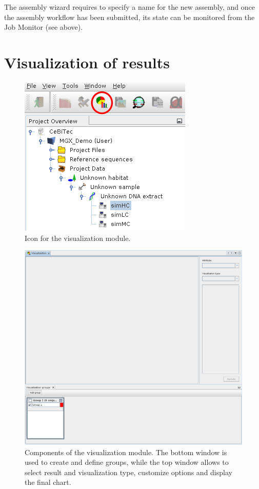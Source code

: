\noindent
The assembly wizard requires to specify a name for the new assembly, and once the assembly workflow has been
submitted, its state can be monitored from the Job Monitor (see above).
\section{Visualization of results}

\begin{figure}[H]
\centering
\includegraphics[width=.6\textwidth]{img/mgx/VizOpen}
\caption[Visualization]{Icon for the visualization module.}
\label{viz1}
\end{figure}

\begin{figure}[H]
\centering
\includegraphics[width=.8\textwidth]{img/mgx/VizComponent}
\caption[Visualization components]{Components of the visualization module. The bottom window is
used to create and define groups, while the top window allows to select result and visualization
type, customize options and display the final chart.}
\label{viz2}
\end{figure}

